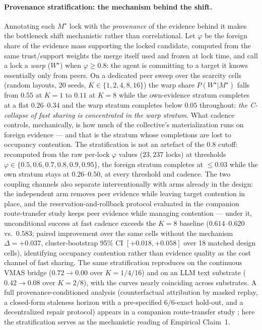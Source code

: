 \documentclass{article}
\begin{document}
\paragraph{Provenance stratification: the mechanism behind the shift.}
Annotating each $M^\star$ lock with the \emph{provenance} of the
evidence behind it makes the bottleneck shift mechanistic rather than
correlational. Let $\varphi$ be the foreign share of the evidence mass
supporting the locked candidate, computed from the same trust/support
weights the merge itself used and frozen at lock time, and call a lock
a \emph{warp} ($W^\star$) when $\varphi \ge 0.8$: the agent is
committing to a target it knows essentially only from peers. On a
dedicated peer sweep over the scarcity cells (random layouts, 20
seeds, $K\in\{1,2,4,8,16\}$) the warp share $P(W^\star|M^\star)$
falls from $0.55$ at $K{=}1$ to $0.11$ at $K{=}8$ while the
own-evidence stratum completes at a flat $0.26$--$0.34$ and the warp
stratum completes below $0.05$ throughout: \emph{the C-collapse of
fast sharing is concentrated in the warp stratum}. What cadence
controls, mechanically, is how much of the collective's
materialization runs on foreign evidence --- and that is
the stratum whose completions are lost to occupancy contention. The stratification is not
an artefact of the $0.8$ cutoff: recomputed from the raw per-lock
$\varphi$ values ($23{,}237$ locks) at thresholds
$\varphi{\in}\{0.5,0.6,0.7,0.8,0.9,0.95\}$, the foreign stratum
completes at ${\le}0.03$ while the own stratum stays at
$0.26$--$0.50$, at every threshold and cadence. The two coupling
channels also separate interventionally with arms already in the
design: the independent arm removes peer evidence while leaving
target contention in place, and the reservation-and-rollback protocol
evaluated in the companion route-transfer study \citep{songlines2} keeps peer evidence
while managing contention --- under it, unconditional success at fast
cadence exceeds the $K{=}8$ baseline ($0.614$--$0.620$ vs.\
$0.583$; paired improvement over the same cells without the mechanism
$\Delta=+0.037$, cluster-bootstrap 95\% CI $[+0.018,+0.058]$ over 18
matched design cells), identifying occupancy contention rather than
evidence quality as the cost channel of fast sharing. The same stratification
reproduces on the continuous VMAS bridge ($0.72\to0.00$ over
$K{=}1/4/16$) and on an LLM text substrate ($0.42\to0.08$ over
$K{=}2/8$), with the curves nearly coinciding across substrates. A
full provenance-conditioned analysis (counterfactual attribution by
masked replay, a closed-form staleness horizon with a pre-specified
$6/6$-exact hold-out, and a decentralized repair protocol) appears in
a companion route-transfer study \citep{songlines2}; here the stratification serves as the
mechanistic reading of Empirical Claim~1.
\end{document}
